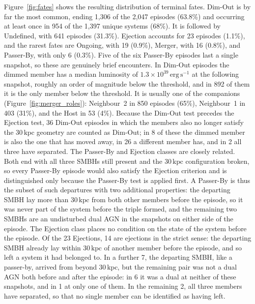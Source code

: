\documentclass[twocolumn, 10pt]{article}
\begin{document}
Figure~\ref{fig:fates} shows the resulting distribution of terminal fates. Dim-Out is by far the most common, ending 1,306 of the 2,047 episodes (63.8\%) and occurring at least once in 954 of the 1,397 unique systems (68\%). It is followed by Undefined, with 641 episodes (31.3\%). Ejection accounts for 23 episodes (1.1\%), and the rarest fates are Ongoing, with 19 (0.9\%), Merger, with 16 (0.8\%), and Passer-By, with only 6 (0.3\%). Five of the six Passer-By episodes last a single snapshot, so these are genuinely brief encounters. In Dim-Out episodes the dimmed member has a median luminosity of $1.3 \times 10^{39}\,\mathrm{erg\,s^{-1}}$ at the following snapshot, roughly an order of magnitude below the threshold, and in 892 of them it is the only member below the threshold. It is usually one of the companions (Figure~\ref{fig:merger_roles}): Neighbour~2 in 850 episodes (65\%), Neighbour~1 in 403 (31\%), and the Host in 53 (4\%). Because the Dim-Out test precedes the Ejection test, 36 Dim-Out episodes in which the members also no longer satisfy the $30\,\mathrm{kpc}$ geometry are counted as Dim-Out; in 8 of these the dimmed member is also the one that has moved away, in 26 a different member has, and in 2 all three have separated. The Passer-By and Ejection classes are closely related. Both end with all three SMBHs still present and the $30\,\mathrm{kpc}$ configuration broken, so every Passer-By episode would also satisfy the Ejection criterion and is distinguished only because the Passer-By test is applied first. A Passer-By is thus the subset of such departures with two additional properties: the departing SMBH lay more than $30\,\mathrm{kpc}$ from both other members before the episode, so it was never part of the system before the triple formed, and the remaining two SMBHs are an undisturbed dual AGN in the snapshots on either side of the episode. The Ejection class places no condition on the state of the system before the episode. Of the 23 Ejections, 14 are ejections in the strict sense: the departing SMBH already lay within $30\,\mathrm{kpc}$ of another member before the episode, and so left a system it had belonged to. In a further 7, the departing SMBH, like a passer-by, arrived from beyond $30\,\mathrm{kpc}$, but the remaining pair was not a dual AGN both before and after the episode: in 6 it was a dual at neither of these snapshots, and in 1 at only one of them. In the remaining 2, all three members have separated, so that no single member can be identified as having left.
\end{document}
